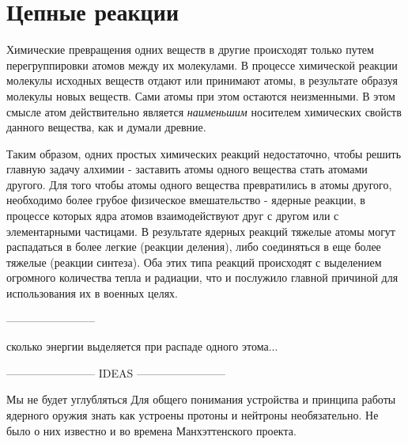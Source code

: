 \section*{Цепные реакции}

Химические превращения одних веществ в другие происходят только путем перегруппировки атомов между их молекулами.
В процессе химической реакции молекулы исходных веществ отдают или принимают атомы, в результате образуя молекулы новых веществ. 
Сами атомы при этом остаются неизменными.
В этом смысле атом действительно является \textit{наименьшим} носителем химических свойств данного вещества, как и думали древние.

Таким образом, одних простых химических реакций недостаточно, чтобы решить главную задачу алхимии - заставить атомы одного вещества стать атомами другого.
Для того чтобы атомы одного вещества превратились в атомы другого, необходимо более грубое физическое вмешательство - ядерные реакции, в процессе которых ядра атомов взаимодействуют друг с другом или с элементарными частицами.
В результате ядерных реакций тяжелые атомы могут распадаться в более легкие (реакции деления), либо соединяться в еще более тяжелые (реакции синтеза).
Оба этих типа реакций происходят с выделением огромного количества тепла и радиации, что и послужило главной причиной для использования их в военных целях.

------------------------

сколько энергии выделяется при распаде одного этома...





------------------------ IDEAS ------------------------ 



Мы не будет углубляться 
Для общего понимания устройства и принципа работы ядерного оружия знать как устроены протоны и нейтроны необязательно. 
Не было о них известно и во времена Манхэттенского проекта.


